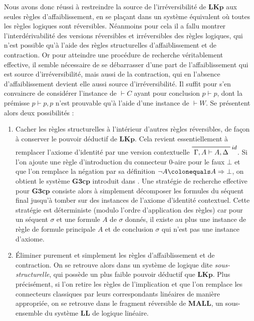 \documentclass[12pt]{report}
\newcommand{\lto}{\Rightarrow}
\newcommand{\seq}{\vdash}
\newcommand{\irule}[1]{\footnotesize$#1$}
\newcommand{\iruleR}[1]{\irule{\seq{#1}}}
\begin{document}
Nous avons donc réussi à restreindre la source de l'irréversibilité de $\mathbf{LKp}$ aux seules règles d'affaiblissement, en se plaçant dans un système équivalent où toutes les règles logiques sont réversibles. Néanmoins pour cela il a fallu montrer l'interdérivabilité des versions réversibles et irréversibles des règles logiques, qui n'est possible qu'à l'aide des règles structurelles d'affaiblissement et de contraction. Or pour atteindre une procédure de recherche véritablement effective, il semble nécessaire de se débarrasser d'une part de l'affaiblissement qui est source d'irréversibilité, mais aussi de la contraction, qui en l'absence d'affaiblissement devient elle aussi source d'irréversibilité. Il suffit pour s'en convaincre de considérer l'instance de {\iruleR{C}} ayant pour conclusion $p \seq p$, dont la prémisse $p \seq p,p$ n'est prouvable qu'à l'aide d'une instance de {\iruleR{W}}. Se présentent alors deux possibilités :
\begin{enumerate}
	\item Cacher les règles structurelles à l'intérieur d'autres règles réversibles, de façon à conserver le pouvoir déductif de $\mathbf{LKp}$. Cela revient essentiellement à remplacer l'axiome d'identité par une version contextuelle $\prfbyaxiom{\irule{id}}{\Gamma,A \seq A,\Delta}$. Si l'on ajoute une règle d'introduction du connecteur 0-aire pour le faux $\bot$ et que l'on remplace la négation par sa définition $\neg A \colonequals A \lto \bot$, on obtient le système $\mathbf{G3cp}$ introduit dans \cite{vPN01}. Une stratégie de recherche effective pour $\mathbf{G3cp}$ consiste alors à simplement décomposer les formules du séquent final jusqu'à tomber sur des instances de l'axiome d'identité contextuel. Cette stratégie est déterministe (modulo l'ordre d'application des règles) car pour un séquent $\sigma$ et une formule $A$ de $\sigma$ donnés, il existe au plus une instance de règle de formule principale $A$ et de conclusion $\sigma$ qui n'est pas une instance d'axiome.
    \item Éliminer purement et simplement les règles d'affaiblissement et de contraction. On se retrouve alors dans un système de logique dite \emph{sous-structurelle}, qui possède un plus faible pouvoir déductif que $\mathbf{LKp}$. Plus précisément, si l'on retire les règles de l'implication et que l'on remplace les connecteurs classiques par leurs correspondants linéaires de manière appropriée, on se retrouve dans le fragment réversible de $\mathbf{MALL}$, un sous-ensemble du système $\mathbf{LL}$ de logique linéaire.
\end{enumerate}
\end{document}
